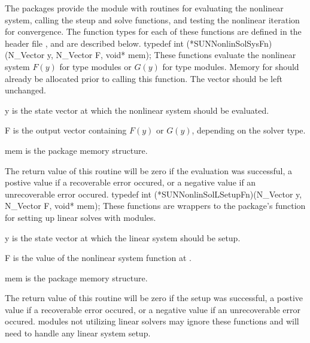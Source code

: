 The {\sundials} packages provide the {\sunnonlinsol} module with
routines for evaluating the nonlinear system, calling the {\sunlinsol}
steup and solve functions, and testing the nonlinear iteration for
convergence. The function types for each of these functions are
defined in the header file ,
and are described below. 
{
  typedef int (*SUNNonlinSolSysFn)(N\_Vector y, N\_Vector F, void* mem);
}
{
  These functions evaluate the nonlinear system $F(y)$
  for  type modules or $G(y)$
  for  type modules. Memory
  for  should already be allocated prior to calling this
  function. The vector  should be left unchanged.
}
{
  \begin{args}[mem]
  \item[y]
    is the state vector at which the nonlinear system should be evaluated.
  \item[F]
    is the output vector containing $F(y)$ or $G(y)$, depending on the
    solver type.
  \item[mem]
    is the {\sundials} package memory structure.
  \end{args}
}
{
  The return value of this routine will be zero if the evaluation was
  successful, a postive value if a recoverable error occured, or a
  negative value if an unrecoverable error occured.
}
{}
{
  typedef int (*SUNNonlinSolLSetupFn)(N\_Vector y, N\_Vector F, void* mem);
}
{
  These functions are wrappers to the {\sundials} package's function
  for setting up linear solves with {\sunlinsol} modules.
}
{
  \begin{args}[mem]
  \item[y]
    is the state vector at which the linear system should be setup.
  \item[F]
    is the value of the nonlinear system function at .
  \item[mem]
    is the {\sundials} package memory structure.
  \end{args}
}
{
  The return value of this routine will be zero if the setup was
  successful, a postive value if a recoverable error occured, or a
  negative value if an unrecoverable error occured.
}
{
  {\sunnonlinsol} modules not utilizing {\sunlinsol} linear solvers
  may ignore these functions and will need to handle any linear system
  setup.
}
